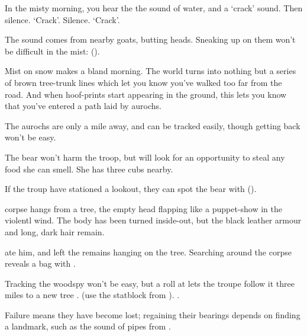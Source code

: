 
\ifcase\value{cycle}


\begin{boxtext}
  In the misty morning, you hear the the sound of water, and a `crack' sound.
  Then silence.
  `Crack'.
  Silence.
  `Crack'.
\end{boxtext}

The sound comes from nearby goats, butting heads.
Sneaking up on them won't be difficult in the mist:  (\tn[9]).

\or


\begin{boxtext}
  Mist on snow makes a bland morning.
  The world turns into nothing but a series of brown tree-trunk lines which let you know you've walked too far from the road.
  And when hoof-prints start appearing in the ground, this lets you know that you've entered a path laid by aurochs.
\end{boxtext}

The aurochs are only a mile away, and can be tracked easily, though getting back won't be easy.


\or


The bear won't harm the troop, but will look for an opportunity to steal any food she can smell.
She has three cubs nearby.

\setcounter{tn}{\value{Dexterity}}
\addtocounter{tn}{\value{Stealth}}

If the troup have stationed a lookout, they can spot the bear with  (\tn).

\bear

\else


\begin{boxtext}
   corpse hangs from a tree, the empty head flapping like a puppet-show in the violentl wind.
  The body has been turned inside-out, but the black leather armour and long, dark hair remain.
\end{boxtext}

 ate him, and left the remains hanging on the tree.
Searching around the corpse reveals a bag with \lootSmall.

Tracking the \gls{woodspy} won't  be easy, but a  roll at \tn[10] lets the troupe follow it three miles to a new tree%
%
  {%
      {.}%
      {(use the statblock from ).}%
  }{.
    \woodspy
  }

Failure means they have become lost; regaining their bearings depends on finding a landmark, such as the sound of pipes from .

\fi
